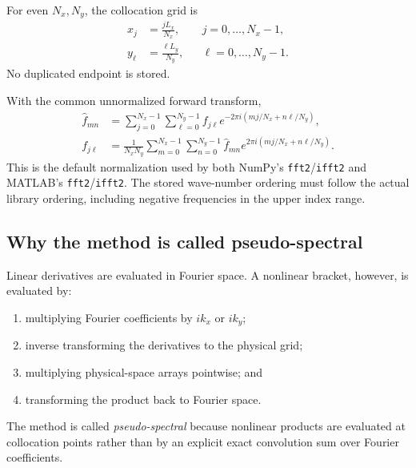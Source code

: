 \documentclass[11pt]{article}
\begin{document}
For even $N_x,N_y$, the collocation grid is
\begin{align}
x_j&=\frac{jL_x}{N_x},
&&j=0,\ldots,N_x-1,\\
y_\ell&=\frac{\ell L_y}{N_y},
&&\ell=0,\ldots,N_y-1.
\end{align}
No duplicated endpoint is stored.

With the common unnormalized forward transform,
\begin{align}
\widehat f_{mn}
&=\sum_{j=0}^{N_x-1}\sum_{\ell=0}^{N_y-1}
f_{j\ell}
e^{-2\pi i(mj/N_x+n\ell/N_y)},\\
f_{j\ell}
&=\frac{1}{N_xN_y}
\sum_{m=0}^{N_x-1}\sum_{n=0}^{N_y-1}
\widehat f_{mn}
e^{2\pi i(mj/N_x+n\ell/N_y)}.
\end{align}
This is the default normalization used by both NumPy's \texttt{fft2}/\texttt{ifft2} and MATLAB's \texttt{fft2}/\texttt{ifft2}. The stored wave-number ordering must follow the actual library ordering, including negative frequencies in the upper index range.

\subsection{Why the method is called pseudo-spectral}

Linear derivatives are evaluated in Fourier space. A nonlinear bracket, however, is evaluated by:
\begin{enumerate}[label=\arabic*.]
  \item multiplying Fourier coefficients by $ik_x$ or $ik_y$;
  \item inverse transforming the derivatives to the physical grid;
  \item multiplying physical-space arrays pointwise; and
  \item transforming the product back to Fourier space.
\end{enumerate}
The method is called \emph{pseudo-spectral} because nonlinear products are evaluated at collocation points rather than by an explicit exact convolution sum over Fourier coefficients.
\end{document}
